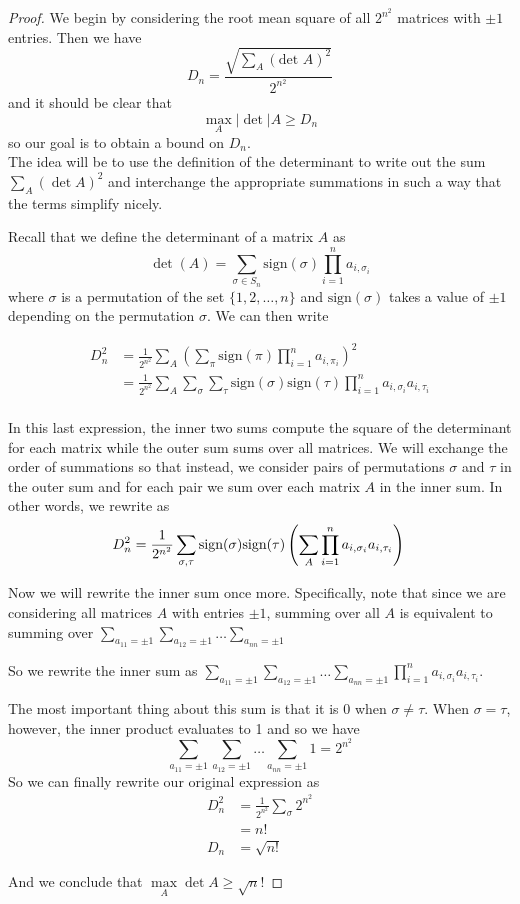 \documentclass{article}
\theoremstyle{definition}
\begin{document}
\begin{proof}
We begin by considering the root mean square of all $2^{n^2}$ matrices with $\pm 1$ entries. Then we have
$$ D_n = \frac{\sqrt{\sum_A (\text{det } A)^2}}{2^{n^2}}$$
and it should be clear that
$$ \underset{A}{\max} |\det| A \geq D_n$$
so our goal is to obtain a bound on $D_n$.\\

The idea will be to use the definition of the determinant to write out the sum $\sum_A (\det A)^2$ and interchange the appropriate summations in such a way that the terms simplify nicely.

Recall that we define the determinant of a matrix $A$ as
$$ \det(A) = \sum_{\sigma \in S_n} \text{sign}(\sigma) \prod_{i=1}^n a_{i, \sigma_i}$$
where $\sigma$ is a permutation of the set $\{1,2,\ldots,n\}$ and $\text{sign}(\sigma)$ takes a value of $\pm 1$ depending on the permutation $\sigma$. We can then write

\begin{align*}
  D_n^2 &= \frac{1}{2^{n^2}} \sum_A \left(\sum_{\pi} \text{sign}(\pi) \prod_{i=1}^n a_{i,\pi_i}\right)^2\\
  &= \frac{1}{2^{n^2}} \sum_A \sum_{\sigma} \sum_{\tau} \text{sign}(\sigma) \text{sign}(\tau) \prod_{i=1}^n a_{i,\sigma_i} a_{i,\tau_i}\\
\end{align*}

In this last expression, the inner two sums compute the square of the determinant for each matrix while the outer sum sums over all matrices. We will exchange the order of summations so that instead, we consider pairs of permutations $\sigma$ and $\tau$ in the outer sum and for each pair we sum over each matrix $A$ in the inner sum. In other words, we rewrite as
$$
  D_n^2 = \frac{1}{2^{n^2}} \sum_{\sigma, \tau}\text{sign}(\sigma) \text{sign}(\tau) \left(\sum_A \prod_{i=1}^n a_{i,\sigma_i}  a_{i,\tau_i} \right)\\
  $$

  Now we will rewrite the inner sum once more. Specifically, note that since we are considering all matrices $A$ with entries $\pm 1$, summing over all $A$ is equivalent to summing over $\sum_{a_{11} = \pm 1} \sum_{a_{12} = \pm 1} \dots \sum_{a_{nn} = \pm 1}$

  So we rewrite the inner sum as $\sum_{a_{11} = \pm 1} \sum_{a_{12} = \pm 1} \dots \sum_{a_{nn} = \pm 1} \prod_{i=1}^n a_{i,\sigma_i}  a_{i,\tau_i}$.

  The most important thing about this sum is that it is 0 when $\sigma \neq \tau$. When $\sigma = \tau$, however, the inner product evaluates to 1 and so we have
  $$ \sum_{a_{11} = \pm 1} \sum_{a_{12} = \pm 1} \dots \sum_{a_{nn} = \pm 1} 1 = 2^{n^2}$$
  So we can finally rewrite our original expression as
  \begin{align*}
  D_n^2 &= \frac{1}{2^{n^2}} \sum_{\sigma} 2^{n^2} \\
  &= n!\\
  D_n &= \sqrt{n!}
  \end{align*}

  And we conclude that $\underset{A}{\max} \det A \geq \sqrt n!$
\end{proof}
\end{document}
